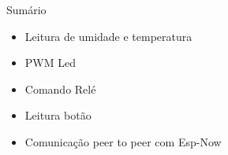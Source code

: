 \begin{frame}{Sumário}
    \begin{itemize}
        \item Leitura de umidade e temperatura
        \item PWM Led
        \item Comando Relé
        \item Leitura botão
        \item Comunicação peer to peer com Esp-Now
    \end{itemize}
\end{frame}